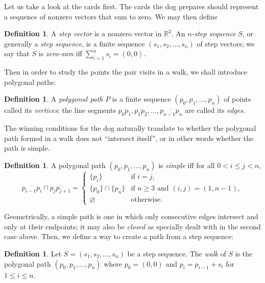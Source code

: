 \documentclass{amsart}
\renewcommand{\emptyset}{\varnothing}
\theoremstyle{definition}
\newtheorem{definition}[proposition]{Definition}
\theoremstyle{problem}
\theoremstyle{remark}
\begin{document}
Let us take a look at the cards first. The cards the dog prepares should represent
a sequence of nonzero vectors that sum to zero. We may then define

\begin{definition}
    A \emph{step vector} is a nonzero vector in $\mathbb{R}^2$.
    An \emph{$n$-step sequence} $S$, or generally a \emph{step sequence},
    is a finite sequence $(s_1,s_2,\dots,s_n)$ of step vectors;
    we say that $S$ is \emph{zero-sum} iff $\sum_{i=1}^{n}s_i=(0,0)$.
\end{definition}

Then in order to study the points the pair visits in a walk, we shall introduce
polygonal paths:

\begin{definition}
    A \emph{polygonal path} $P$ is a finite sequence $(p_0,p_1,\dots,p_n)$
    of points called its \emph{vertices}; the line segments
    $\overline{p_0p_1},\overline{p_1p_2},\dots,\overline{p_{n-1}p_n}$
    are called its \emph{edges}.
\end{definition}

The winning conditions for the dog naturally translate to whether the polygonal
path formed in a walk does not ``intersect itself'', or in other words whether
the path is simple.

\begin{definition}
    A polygonal path $(p_0,p_1,\dots,p_n)$ is \emph{simple}
    iff for all $0<i\le j<n$,
    \[
        \overline{p_{i-1}p_i}\cap\overline{p_jp_{j+1}}=
        \begin{cases}
            \{p_i\}            & \text{if $i=j$},                       \\
            \{p_0\}\cap\{p_n\} & \text{if $n\ge3$ and $(i,j)=(1,n-1)$}, \\
            \emptyset          & \text{otherwise}.
        \end{cases}
    \]
\end{definition}

Geometrically, a simple path is one in which only consecutive
edges intersect and only at their endpoints; it may also
be \emph{closed} as specially dealt with in the second case above.
Then, we define a way to create a path from a step sequence:

\begin{definition}
    Let $S=(s_1,s_2,\dots,s_n)$ be a step sequence. The \emph{walk} of $S$
    is the polygonal path $(p_0,p_1,\dots,p_n)$
    where $p_0=(0,0)$ and $p_i=p_{i-1}+s_i$ for $1\le i\le n$.
\end{definition}
\end{document}
